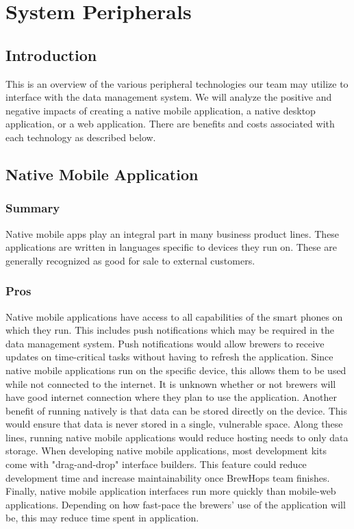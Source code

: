 \documentclass[draftclsnofoot,onecolumn,letterpaper,10pt,compsoc]{IEEEtran}
\begin{document}
\section{System Peripherals}
    \subsection{Introduction}
        This is an overview of the various peripheral technologies our team may utilize to interface with the data management system. 
        We will analyze the positive and negative impacts of creating a native mobile application, a native desktop application, or a web application.
        There are benefits and costs associated with each technology as described below.

	\subsection{Native Mobile Application}
        \subsubsection{Summary}
            Native mobile apps play an integral part in many business product lines.
            These applications are written in languages specific to devices they run on.
            These are generally recognized as good for sale to external customers\cite{SearchCloudOverview}.

        \subsubsection{Pros}
            Native mobile applications have access to all capabilities of the smart phones on which they run. 
            This includes push notifications which may be required in the data management system. 
            Push notifications would allow brewers to receive updates on time-critical tasks without having to refresh the application.
            Since native mobile applications run on the specific device, this allows them to be used while not connected to the internet.
            It is unknown whether or not brewers will have good internet connection where they plan to use the application.
            Another benefit of running natively is that data can be stored directly on the device.
            This would ensure that data is never stored in a single, vulnerable space.
            Along these lines, running native mobile applications would reduce hosting needs to only data storage.
            When developing native mobile applications, most development kits come with "drag-and-drop" interface builders. 
            This feature could reduce development time and increase maintainability once BrewHops team finishes.
            Finally, native mobile application interfaces run more quickly than mobile-web applications.
            Depending on how fast-pace the brewers' use of the application will be, this may reduce time spent in application.
\end{document}
